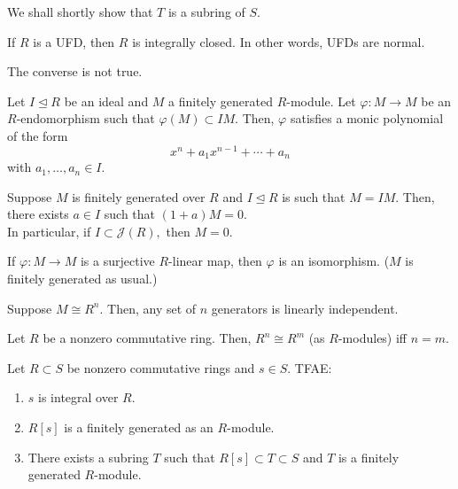 \documentclass[12pt]{article}	%
\begin{document}
We shall shortly show that $T$ is a subring of $S.$

\begin{thm}
	If $R$ is a UFD, then $R$ is integrally closed. In other words, UFDs are normal.
\end{thm}
The converse is not true.

\begin{thm}
	Let $I \unlhd R$ be an ideal and $M$ a finitely generated $R$-module. Let $\varphi : M \to M$ be an $R$-endomorphism such that $\varphi(M) \subset IM.$ Then, $\varphi$ satisfies a monic polynomial of the form
	\begin{equation*} 
		x^n + a_1x^{n - 1} + \cdots + a_n
	\end{equation*}
	with $a_1, \ldots, a_n \in I.$
\end{thm}

\begin{cor}[Nakayama]
	Suppose $M$ is finitely generated over $R$ and $I \unlhd R$ is such that $M = IM.$ Then, there exists $a \in I$ such that $(1 + a)M = 0.$\\
	In particular, if $I \subset \mathcal{J}(R),$ then $M = 0.$
\end{cor}

\begin{cor}
	If $\varphi : M \to M$ is a surjective $R$-linear map, then $\varphi$ is an isomorphism. ($M$ is finitely generated as usual.)
\end{cor}

\begin{cor}
	Suppose $M \cong R^n.$ Then, any set of $n$ generators is linearly independent.
\end{cor}

\begin{cor}
	Let $R$ be a nonzero commutative ring. Then, $R^n \cong R^m$ (as $R$-modules) iff $n = m.$
\end{cor}

\begin{thm}
	Let $R \subset S$ be nonzero commutative rings and $s \in S.$ TFAE:
	\begin{enumerate}
		\item $s$ is integral over $R.$
		\item $R[s]$ is a finitely generated as an $R$-module.
		\item There exists a subring $T$ such that $R[s] \subset T \subset S$ and $T$ is a finitely generated $R$-module.
	\end{enumerate}
\end{thm}
\end{document}
